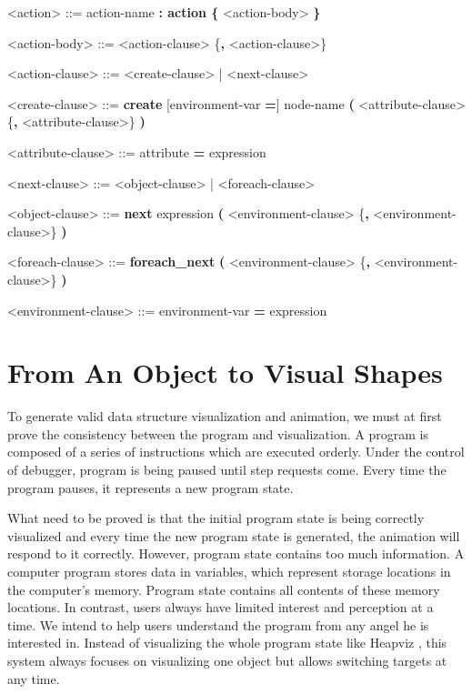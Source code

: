 \begin{center}
  \begin{minipage}{0.8\linewidth}
    \begin{grammar}
      <action> ::= action-name \textbf{: action \{} <action-body> \textbf{\}}

      <action-body> ::= <action-clause> \{\textbf{,} <action-clause>\}

      <action-clause> ::= <create-clause> | <next-clause>

      <create-clause> ::= \textbf{create} [environment-var \textbf{=}] node-name \textbf{(} <attribute-clause> \{\textbf{,} <attribute-clause>\} \textbf{)}

      <attribute-clause> ::= attribute \textbf{=} expression

      <next-clause> ::= <object-clause> | <foreach-clause>

      <object-clause> ::= \textbf{next} expression \textbf{(} <environment-clause> \{\textbf{,} <environment-clause>\} \textbf{)}

      <foreach-clause> ::= \textbf{foreach\_next} \textbf{(} <environment-clause> \{\textbf{,} <environment-clause>\} \textbf{)}

      <environment-clause> ::= environment-var \textbf{=} expression
    \end{grammar}
  \end{minipage}
\end{center}

\section {From An Object to Visual Shapes}
To generate valid data structure visualization and animation, we must at first prove the consistency between the program and visualization. A program is composed of a series of instructions which are executed orderly. Under the control of debugger, program is being paused until step requests come. Every time the program pauses, it represents a new program state. 

What need to be proved is that the initial program state is being correctly visualized and every time the new program state is generated, the animation will respond to it correctly. However, program state contains too much information. A computer program stores data in variables, which represent storage locations in the computer's memory. Program state contains all contents of these memory locations. In contrast, users always have limited interest and perception at a time. We intend to help users understand the program from any angel he is interested in. Instead of visualizing the whole program state like Heapviz \cite{Aftandilian:2010:HIH:1879211.1879222}, this system always focuses on visualizing one object but allows switching targets at any time.

